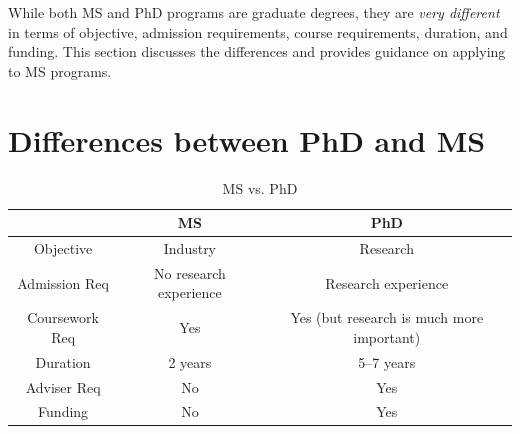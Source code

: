 \documentclass[oneside,11pt]{book}
\begin{document}
While both MS and PhD programs are graduate degrees, they are \emph{very different} in terms of objective, admission requirements, course requirements, duration, and funding. This section discusses the differences and provides guidance on applying to MS programs.

\section{Differences between PhD and MS}\label{sec:phd-vs-ms}

\begin{table}
    \caption{MS vs. PhD}\label{tab:phd-vs-ms}
    \centering
    \small
    \begin{tabular}{c|c|c}
    \toprule
    \textbf{} & \textbf{MS} & \textbf{PhD} \\
    \midrule
    Objective & Industry & Research \\
    Admission Req & No research experience & Research experience \\
    Coursework Req & Yes & Yes (but research is much more important)  \\
    Duration & 2 years & 5--7 years \\
    Adviser Req & No & Yes \\
    Funding & No & Yes \\
    \bottomrule
    \end{tabular}
  \end{table}
\end{document}
